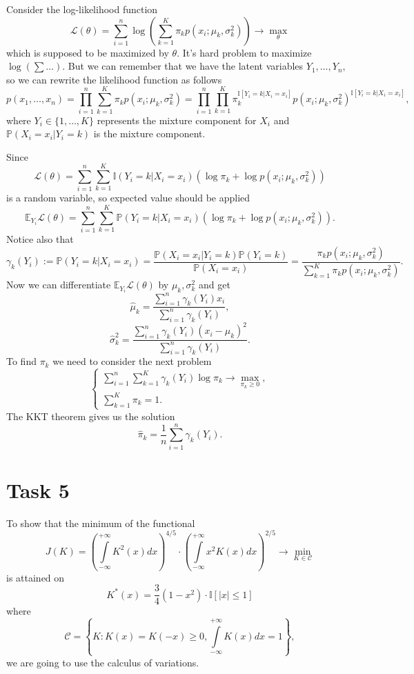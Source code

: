 \documentclass[a4paper, 12pt]{article}
\begin{document}
Consider the log-likelihood function
$$
\mathcal{L}(\theta) = \sum \limits_{i=1}^n \log \left( \sum \limits_{k=1}^K \pi_k p(x_i; \mu_k, \sigma^2_k) \right) \rightarrow \max \limits_{\theta}
$$
which is supposed to be maximized by $\theta.$
It's hard problem to maximize $\log(\sum \ldots).$ But we can remember that we have the latent variables $Y_1, \ldots, Y_n,$ so we can rewrite the likelihood function as follows
$$
p(x_1, \ldots, x_n) = \prod \limits_{i=1}^n \sum \limits_{k=1}^K \pi_k p(x_i; \mu_k, \sigma^2_k) = \prod \limits_{i=1}^n \prod \limits_{k=1}^K \pi_k^{\mathbb{I}[Y_i = k|X_i = x_i]} p(x_i; \mu_k, \sigma^2_k)^{\mathbb{I}[Y_i = k|X_i = x_i]},
$$
where $ Y_i \in \{ 1, \ldots, K \}$ represents the mixture component for $X_i$ and $\mathbb{P}(X_i = x_i|Y_i = k)$ is the mixture component.

Since 
$$
\mathcal{L}(\theta) =  \sum \limits_{i=1}^n \sum \limits_{k=1}^K \mathbb{I}(Y_i = k|X_i = x_i) (\log \pi_k + \log p(x_i; \mu_k, \sigma^2_k))
$$ 
is a random variable, so expected value should be applied
$$
\mathbb{E}_{Y_i} \mathcal{L}(\theta) =  \sum \limits_{i=1}^n \sum \limits_{k=1}^K \mathbb{P}(Y_i = k|X_i = x_i) (\log \pi_k + \log p(x_i; \mu_k, \sigma^2_k)).
$$ 
Notice also that
$$
\gamma_k(Y_i) := \mathbb{P}(Y_i = k | X_i = x_i) = \dfrac{\mathbb{P}(X_i = x_i | Y_i = k) \mathbb{P}(Y_i = k)}{\mathbb{P}(X_i = x_i)} = \dfrac{\pi_k p(x_i; \mu_k, \sigma^2_k)}{\sum \limits_{k=1}^K \pi_k p(x_i; \mu_k, \sigma^2_k)}.
$$
Now we can differentiate $\mathbb{E}_{Y_i} \mathcal{L}(\theta)$ by $\mu_k, \sigma_k^2$ and get 
$$
\hat{\mu}_k = \dfrac{\sum \limits_{i=1}^n \gamma_k(Y_i) x_i}{\sum \limits_{i=1}^n \gamma_k(Y_i)},
$$
$$
\hat{\sigma}_k^2 = \dfrac{\sum \limits_{i=1}^n \gamma_k(Y_i) (x_i - \mu_k)^2}{\sum \limits_{i=1}^n \gamma_k(Y_i)}.
$$
To find $\pi_k$ we need to consider the next problem
$$
\begin{cases}
\sum \limits_{i=1}^n \sum \limits_{k=1}^K \gamma_k(Y_i) \log \pi_k \rightarrow \max \limits_{\pi_k \geqslant 0}, \\
\sum \limits_{k=1}^K \pi_k = 1.
\end{cases}
$$
The KKT theorem gives us the solution
$$
\hat{\pi}_k = \dfrac{1}{n} \sum \limits_{i=1}^n \gamma_k(Y_i).
$$
 
\section{Task 5}
To show that the minimum of the functional
$$
J(K) = \left( \int \limits_{- \infty}^{+\infty} K^2(x)dx \right)^{4/5} \cdot \left( \int \limits_{- \infty}^{+\infty} x^2 K(x)dx \right)^{2/5} \rightarrow \min \limits_{K \in \mathcal{C}}
$$
is attained on 
$$
K^*(x) = \dfrac{3}{4}(1 - x^2) \cdot \mathbb{I}[|x| \leqslant 1]
$$
where
\begin{equation}
\label{eq1}
\mathcal{C} = \left \{ K : K(x) = K(-x) \geqslant 0, \int \limits_{- \infty}^{+\infty} K(x)dx = 1 \right \},
\end{equation}
we are going to use the calculus of variations. 
\end{document}
